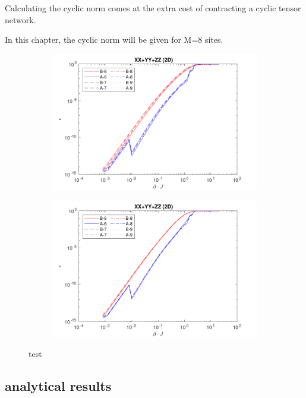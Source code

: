 Calculating the cyclic norm comes at the extra cost of contracting a cyclic tensor network. 

In this chapter, the cyclic norm will be given for M=8 sites.

\begin{figure}[H]
    \begin{subfigure}[]{\textwidth}
        \includegraphics[width=\textwidth]{Figuren/benchmarking/keuze_norm/linear.pdf}
    \end{subfigure}

    \begin{subfigure}[]{\textwidth}
        \includegraphics[width=\textwidth]{Figuren/benchmarking/keuze_norm/cyclic.pdf}
    \end{subfigure}
    \caption{test }
    \label{benchmarking:systemsize}
\end{figure}

\subsection{analytical results}